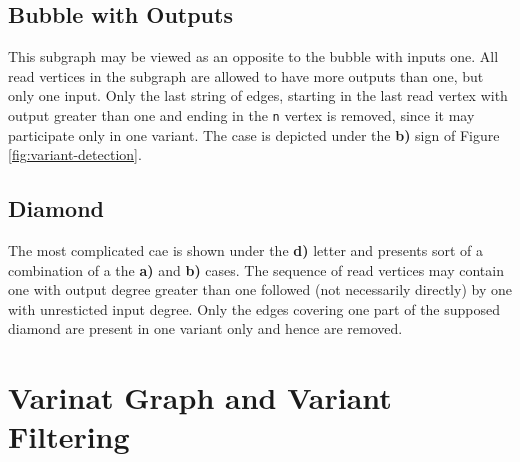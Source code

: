 \subsection{Bubble with Outputs}
\label{subsec:bubble-with-outputs}

This subgraph may be viewed as an opposite to the bubble with inputs one. All read vertices in the subgraph are allowed to have more outputs than one, but only one input. Only the last string of edges, starting in the last read vertex with output greater than one and ending in the \texttt{n} vertex is removed, since it may participate only in one variant. The case is depicted under the \textbf{b)} sign of Figure \ref{fig:variant-detection}.

\subsection{Diamond}
\label{subsec:diamond}

The most complicated cae is shown under the \textbf{d)} letter and presents sort of a combination of a the \textbf{a)} and \textbf{b)} cases. The sequence of read vertices may contain one with output degree greater than one followed (not necessarily directly) by one with unresticted input degree. Only the edges covering one part of the supposed diamond are present in one variant only and hence are removed. 

\section{Varinat Graph and Variant Filtering}
\label{sec:variant-graph-and-variant-filtering}

